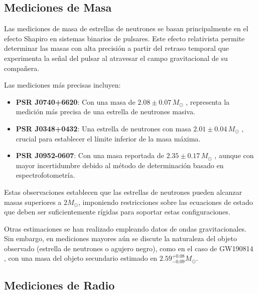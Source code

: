 \subsection{Mediciones de Masa}

Las mediciones de masa de estrellas de neutrones se basan principalmente en el efecto Shapiro en sistemas binarios de pulsares. Este efecto relativista permite determinar las masas con alta precisión a partir del retraso temporal que experimenta la señal del pulsar al atravesar el campo gravitacional de su compañera.

Las mediciones más precisas incluyen:

\begin{itemize}
	\item \textbf{PSR J0740+6620}: Con una masa de $2.08 \pm 0.07 \, M_\odot$ \cite{fonsecaRefinedMassGeometric2021}, representa la medición más precisa de una estrella de neutrones masiva.
	
	\item \textbf{PSR J0348+0432}: Una estrella de neutrones con masa $2.01 \pm 0.04 \, M_\odot$ \cite{antoniadisMassivePulsarCompact2013}, crucial para establecer el límite inferior de la masa máxima.
	
	\item \textbf{PSR J0952-0607}: Con una masa reportada de $2.35 \pm 0.17 \, M_\odot$ \cite{romaniPSRJ09520607Fastest2022}, aunque con mayor incertidumbre debido al método de determinación basado en espectrofotometría.
\end{itemize}

Estas observaciones establecen que las estrellas de neutrones pueden alcanzar masas superiores a $2 M_\odot$, imponiendo restricciones sobre las ecuaciones de estado que deben ser suficientemente rígidas para soportar estas configuraciones.

Otras estimaciones se han realizado empleando datos de ondas gravitacionales. Sin embargo, en mediciones mayores aún se discute la naturaleza del objeto observado (estrella de neutrones o agujero negro), como en el caso de GW190814 \cite{theligoscientificcollaborationGW190814GravitationalWaves2020} \cite{lopesNatureMassgapObject2022}, con una masa del objeto secundario estimado en $2.59^{+0.08}_{-0.09} M_\odot$.

\subsection{Mediciones de Radio}

